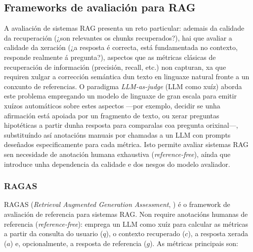 \documentclass[11pt, a4paper, oneside]{report}
\begin{document}
\subsection{Frameworks de avaliación para RAG}
\label{sec:avaliacion_teoria}

A avaliación de sistemas RAG presenta un reto particular: ademais da calidade da
recuperación (¿son relevantes os chunks recuperados?), hai que avaliar a calidade da
xeración (¿a resposta é correcta, está fundamentada no contexto, responde realmente á
pregunta?), aspectos que as métricas clásicas de recuperación de información (precisión,
recall, etc.) non capturan, xa que requiren xulgar a corrección semántica dun texto en
linguaxe natural fronte a un conxunto de referencias. O paradigma \textit{LLM-as-judge}
(LLM como xuíz) aborda este problema empregando un modelo de linguaxe de gran escala
para emitir xuízos automáticos sobre estes aspectos —por exemplo, decidir se unha
afirmación está apoiada por un fragmento de texto, ou xerar preguntas hipotéticas a
partir dunha resposta para comparalas coa pregunta orixinal—, substituíndo así
anotacións manuais por chamadas a un LLM con prompts deseñados especificamente para cada
métrica. Isto permite avaliar sistemas RAG sen necesidade de anotación humana exhaustiva
(\textit{reference-free}), aínda que introduce unha dependencia da calidade e dos
nesgos do modelo avaliador.

\subsubsection{RAGAS}
\label{sec:ragas_teoria}

RAGAS (\textit{Retrieval Augmented Generation Assessment},
\citealt{es2023ragas}) é o framework de avaliación de referencia para sistemas RAG.
Non require anotacións humanas de referencia (\textit{reference-free}): emprega un LLM
como xuíz para calcular as métricas a partir da consulta do usuario ($q$), o contexto
recuperado ($c$), a resposta xerada ($a$) e, opcionalmente, a resposta de referencia
($g$). As métricas principais son:
\end{document}
